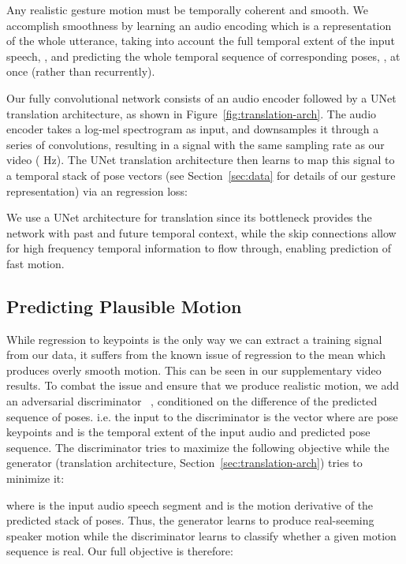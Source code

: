 \documentclass[10pt,twocolumn,letterpaper]{article}
\newcommand{\sect}[1]{Section~\ref{#1}}
\newcommand{\unet}{UNet}
\begin{document}
Any realistic gesture motion must be temporally coherent and smooth. We accomplish smoothness by learning an audio encoding which is a representation of the whole utterance, taking into account the full temporal extent of the input speech, , and predicting the whole temporal sequence of corresponding poses, , at once (rather than recurrently).

Our fully convolutional network consists of an audio encoder followed by a  \unet{}~\cite{unet,pix2pix2017} translation architecture, as shown in
Figure~\ref{fig:translation-arch}. The audio encoder takes a  log-mel spectrogram as input, and downsamples it through a series of convolutions, resulting in a  signal with the same sampling rate as our video ( Hz). The \unet{} translation architecture then learns to map this signal to a temporal stack of pose vectors (see \sect{sec:data} for details of our gesture representation) via an  regression loss:

We use a \unet{} architecture for translation since its bottleneck provides the network with past and future temporal context, while the skip connections allow for high frequency temporal information to flow through, enabling prediction of fast motion.


\subsection{Predicting Plausible Motion}
While  regression to keypoints is the only way we can extract a training signal from our data, it suffers from the known issue of regression to the mean which produces overly smooth motion. This can be seen in our supplementary video results. To combat the issue and ensure that we produce realistic motion, we add an adversarial discriminator~\cite{pix2pix2017,Chan2018dance} , conditioned on the difference of the predicted sequence of poses. i.e.
the input to the discriminator is the vector  where  are  pose keypoints and  is the temporal extent of the input audio and predicted pose sequence. The discriminator  tries to maximize the following objective while the generator  (translation architecture, Section~\ref{sec:translation-arch}) tries to minimize it:

where  is the input audio speech segment and  is the motion derivative of the predicted stack of poses. Thus, the generator learns to produce real-seeming speaker motion while the discriminator learns to classify whether a given motion sequence is real. Our full objective is therefore:
\end{document}
